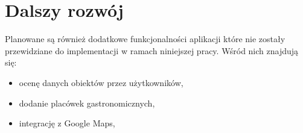 \newpage
\section{Dalszy rozwój}
Planowane są również dodatkowe funkcjonalności aplikacji które nie zostały przewidziane do implementacji w ramach niniejszej pracy. Wśród nich znajdują się:
\begin{itemize}
    \item ocenę danych obiektów przez użytkowników,
    \item dodanie placówek gastronomicznych,
    \item integrację z Google Maps,
\end{itemize}